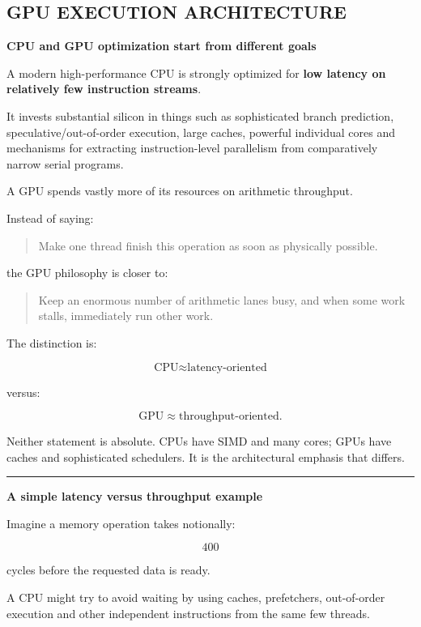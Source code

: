 \subsection{GPU EXECUTION ARCHITECTURE}\label{01-foundations-i-ch008-gpu-execution-architecture}

\textbf{CPU and GPU optimization start from different goals}

A modern high-performance CPU is strongly optimized for \textbf{low latency on relatively few instruction streams}.

It invests substantial silicon in things such as sophisticated branch prediction, speculative/out-of-order execution, large caches, powerful individual cores and mechanisms for extracting instruction-level parallelism from comparatively narrow serial programs.

A GPU spends vastly more of its resources on arithmetic throughput.

Instead of saying:

\begin{quote}
Make one thread finish this operation as soon as physically possible.
\end{quote}

the GPU philosophy is closer to:

\begin{quote}
Keep an enormous number of arithmetic lanes busy, and when some work stalls, immediately run other work.
\end{quote}

The distinction is:

\[
\boxed{
\text{CPU}\approx\text{latency-oriented}
}
\]

versus:

\[
\boxed{
\text{GPU}\approx\text{throughput-oriented}.
}
\]

Neither statement is absolute. CPUs have SIMD and many cores; GPUs have caches and sophisticated schedulers. It is the architectural emphasis that differs.

\begin{center}\rule{0.5\linewidth}{0.5pt}\end{center}

\textbf{A simple latency versus throughput example}

Imagine a memory operation takes notionally:

\[
400
\]

cycles before the requested data is ready.

A CPU might try to avoid waiting by using caches, prefetchers, out-of-order execution and other independent instructions from the same few threads.

